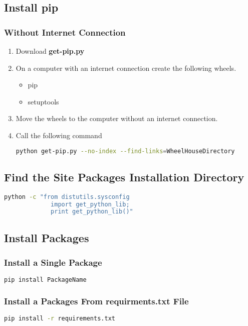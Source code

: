 \subsection{Install pip}
%
\subsubsection{Without Internet Connection}
\begin{enumerate}
  \item Download \textbf{get-pip.py}
  \item On a computer with an internet connection create the following wheels.
    \begin{itemize}
      \item pip
      \item setuptools
    \end{itemize}
  \item Move the wheels to the computer without an internet connection.
  \item Call the following command
\begin{lstlisting}[language=bash, numbers=none]
  python get-pip.py --no-index --find-links=WheelHouseDirectory
\end{lstlisting}
\end{enumerate}

\subsection{Find the Site Packages Installation Directory}
\begin{lstlisting}[language=bash, numbers=none]
  python -c "from distutils.sysconfig
             import get_python_lib;
             print get_python_lib()"
\end{lstlisting}

\subsection{Install Packages}
%
\subsubsection{Install a Single Package}
\begin{lstlisting}[language=bash, numbers=none]
  pip install PackageName
\end{lstlisting}
%
\subsubsection{Install a Packages From requirments.txt File}
\begin{lstlisting}[language=bash, numbers=none]
  pip install -r requirements.txt
\end{lstlisting}
%
